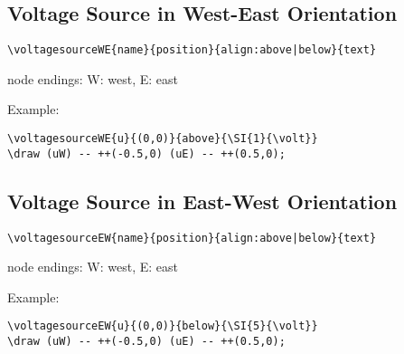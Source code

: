 \documentclass[parskip=full]{scrartcl}
\begin{document}
\subsection{Voltage Source in West-East Orientation}

\begin{verbatim}
\voltagesourceWE{name}{position}{align:above|below}{text}
\end{verbatim}
node endings: W: west, E: east

Example:\\
\begin{minipage}{0.8\textwidth}
\begin{verbatim}
\voltagesourceWE{u}{(0,0)}{above}{\SI{1}{\volt}}
\draw (uW) -- ++(-0.5,0) (uE) -- ++(0.5,0);
\end{verbatim}
\end{minipage}
\begin{minipage}{0.19\textwidth}
\end{minipage}

\subsection{Voltage Source in East-West Orientation}

\begin{verbatim}
\voltagesourceEW{name}{position}{align:above|below}{text}
\end{verbatim}
node endings: W: west, E: east

Example:\\
\begin{minipage}{0.8\textwidth}
\begin{verbatim}
\voltagesourceEW{u}{(0,0)}{below}{\SI{5}{\volt}}
\draw (uW) -- ++(-0.5,0) (uE) -- ++(0.5,0);
\end{verbatim}
\end{minipage}
\begin{minipage}{0.19\textwidth}
\end{minipage}
\end{document}
